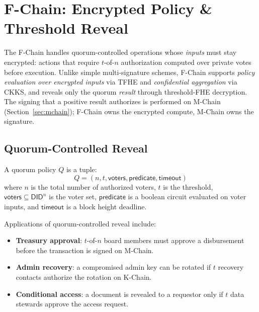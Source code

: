 

\section{F-Chain: Encrypted Policy \& Threshold Reveal}
\label{sec:fchain-policy}

The F-Chain handles quorum-controlled operations whose \emph{inputs} must stay
encrypted: actions that require $t$-of-$n$ authorization computed over private
votes before execution. Unlike simple multi-signature schemes, F-Chain supports
\emph{policy evaluation over encrypted inputs} via TFHE and \emph{confidential
aggregation} via CKKS, and reveals only the quorum \emph{result} through
threshold-FHE decryption. The signing that a positive result authorizes is
performed on M-Chain (Section~\ref{sec:mchain}); F-Chain owns the encrypted
compute, M-Chain owns the signature.

\subsection{Quorum-Controlled Reveal}

\begin{definition}\label{def:quorum}
A quorum policy $Q$ is a tuple:
\[
    Q = (n, t, \mathsf{voters}, \mathsf{predicate}, \mathsf{timeout})
\]
where $n$ is the total number of authorized voters, $t$ is the threshold,
$\mathsf{voters} \subseteq \mathsf{DID}^n$ is the voter set,
$\mathsf{predicate}$ is a boolean circuit evaluated on voter inputs,
and $\mathsf{timeout}$ is a block height deadline.
\end{definition}

Applications of quorum-controlled reveal include:
\begin{itemize}
    \item \textbf{Treasury approval}: $t$-of-$n$ board members must approve a
          disbursement before the transaction is signed on M-Chain.
    \item \textbf{Admin recovery}: a compromised admin key can be rotated if $t$
          recovery contacts authorize the rotation on K-Chain.
    \item \textbf{Conditional access}: a document is revealed to a requestor only
          if $t$ data stewards approve the access request.
\end{itemize}

